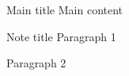 \documentclass[20pt]{beamer}
\begin{document}
\begin{frame}{Main title}
  Main content \vfill
  \begin{appxnote}{Note title}
      Paragraph 1 \bigskip
      
      Paragraph 2
  \end{appxnote}
\end{frame}
\printappxnotes
\end{document}
